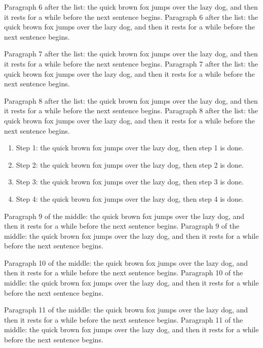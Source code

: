 \documentclass{article}
\begin{document}
Paragraph 6 after the list: the quick brown fox jumps over the lazy dog, and then it rests for a while before the next sentence begins. Paragraph 6 after the list: the quick brown fox jumps over the lazy dog, and then it rests for a while before the next sentence begins. 

Paragraph 7 after the list: the quick brown fox jumps over the lazy dog, and then it rests for a while before the next sentence begins. Paragraph 7 after the list: the quick brown fox jumps over the lazy dog, and then it rests for a while before the next sentence begins. 

Paragraph 8 after the list: the quick brown fox jumps over the lazy dog, and then it rests for a while before the next sentence begins. Paragraph 8 after the list: the quick brown fox jumps over the lazy dog, and then it rests for a while before the next sentence begins. 

\begin{enumerate}
\item Step 1: the quick brown fox jumps over the lazy dog, then step 1 is done.

\item Step 2: the quick brown fox jumps over the lazy dog, then step 2 is done.

\item Step 3: the quick brown fox jumps over the lazy dog, then step 3 is done.

\item Step 4: the quick brown fox jumps over the lazy dog, then step 4 is done.

\end{enumerate}
Paragraph 9 of the middle: the quick brown fox jumps over the lazy dog, and then it rests for a while before the next sentence begins. Paragraph 9 of the middle: the quick brown fox jumps over the lazy dog, and then it rests for a while before the next sentence begins. 

Paragraph 10 of the middle: the quick brown fox jumps over the lazy dog, and then it rests for a while before the next sentence begins. Paragraph 10 of the middle: the quick brown fox jumps over the lazy dog, and then it rests for a while before the next sentence begins. 

Paragraph 11 of the middle: the quick brown fox jumps over the lazy dog, and then it rests for a while before the next sentence begins. Paragraph 11 of the middle: the quick brown fox jumps over the lazy dog, and then it rests for a while before the next sentence begins. 
\end{document}
